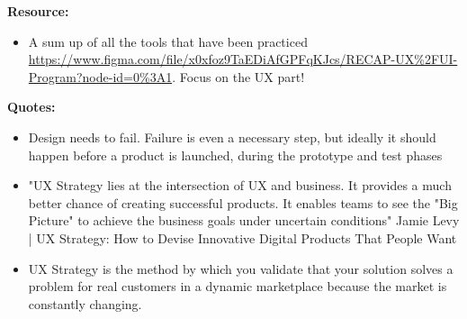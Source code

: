\textbf{Resource:}

\begin{itemize}
\item A sum up of all the tools that have been practiced \url{https://www.figma.com/file/x0xfoz9TaEDiAfGPFqKJcs/RECAP-UX%2FUI-Program?node-id=0%3A1}. Focus on the UX part!
\end{itemize}

\textbf{Quotes:}

\begin{itemize}
\item Design needs to fail. Failure is even a necessary step, but ideally it should happen before a product is launched, during the prototype and test phases
\item "UX Strategy lies at the intersection of UX and business. It provides a much better chance of creating successful products. It enables teams to see the "Big Picture" to achieve the business goals under uncertain conditions" Jamie Levy | UX Strategy: How to Devise Innovative Digital Products That People Want
\item UX Strategy is the method by which you validate that your solution solves a problem for real customers in a dynamic marketplace because the market is constantly changing.
\end{itemize}

